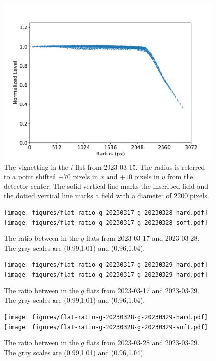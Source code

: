 \documentclass{article}
\begin{document}
\begin{figure}[pb]
\begin{center}
\includegraphics[width=0.7\columnwidth]{figures/flat-vignetting-shifted.pdf}
\medskip
\caption{The vignetting in the $i$ flat from 2023-03-15. The radius is referred to a point shifted $+70$ pixels in $x$ and $+10$ pixels in $y$ from the detector center. The solid vertical line marks the inscribed field and the dotted vertical line marks a field with a diameter of 2200 pixels.}
\label{figure:flat-vignetting-shifted}
\end{center}
\end{figure}

\begin{figure}[pb]
\begin{center}
\texttt{[image: figures/flat-ratio-g-20230317-g-20230328-hard.pdf]}
\texttt{[image: figures/flat-ratio-g-20230317-g-20230328-soft.pdf]}
\medskip
\caption{The ratio between in the $g$ flats from 2023-03-17 and 2023-03-28. The gray scales are (0.99,1.01) and (0.96,1.04).}
\label{figure:flat-ratio-g-20230317-g-20230328}
\label{figure:flat-ratio-first}
\end{center}
\end{figure}

\begin{figure}[pb]
\begin{center}
\texttt{[image: figures/flat-ratio-g-20230317-g-20230329-hard.pdf]}
\texttt{[image: figures/flat-ratio-g-20230317-g-20230329-hard.pdf]}
\medskip
\caption{The ratio between in the $g$ flats from 2023-03-17 and 2023-03-29. The gray scales are (0.99,1.01) and (0.96,1.04).}
\label{figure:flat-ratio-g-20230317-g-20230329}
\end{center}
\end{figure}

\begin{figure}[pb]
\begin{center}
\texttt{[image: figures/flat-ratio-g-20230328-g-20230329-hard.pdf]}
\texttt{[image: figures/flat-ratio-g-20230328-g-20230329-soft.pdf]}
\medskip
\caption{The ratio between in the $g$ flats from 2023-03-28 and 2023-03-29. The gray scales are (0.99,1.01) and (0.96,1.04).}
\label{figure:flat-ratio-g-20230328-g-20230329}
\end{center}
\end{figure}
\end{document}
